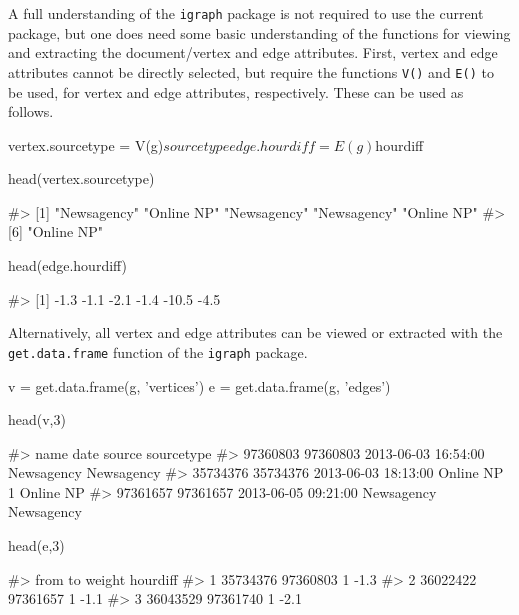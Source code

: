 A full understanding of the \texttt{igraph} package is not required to
use the current package, but one does need some basic understanding of
the functions for viewing and extracting the document/vertex and edge
attributes. First, vertex and edge attributes cannot be directly
selected, but require the functions \texttt{V()} and \texttt{E()} to be
used, for vertex and edge attributes, respectively. These can be used as
follows.

\begin{Schunk}
\begin{Sinput}
vertex.sourcetype = V(g)$sourcetype
edge.hourdiff = E(g)$hourdiff

head(vertex.sourcetype)
\end{Sinput}
\begin{Soutput}
#> [1] "Newsagency" "Online NP"  "Newsagency" "Newsagency" "Online NP" 
#> [6] "Online NP"
\end{Soutput}
\begin{Sinput}
head(edge.hourdiff)
\end{Sinput}
\begin{Soutput}
#> [1]  -1.3  -1.1  -2.1  -1.4 -10.5  -4.5
\end{Soutput}
\end{Schunk}

Alternatively, all vertex and edge attributes can be viewed or extracted
with the \texttt{get.data.frame} function of the \texttt{igraph}
package.

\begin{Schunk}
\begin{Sinput}
v = get.data.frame(g, 'vertices')
e = get.data.frame(g, 'edges')

head(v,3)
\end{Sinput}
\begin{Soutput}
#>              name                date      source sourcetype
#> 97360803 97360803 2013-06-03 16:54:00  Newsagency Newsagency
#> 35734376 35734376 2013-06-03 18:13:00 Online NP 1  Online NP
#> 97361657 97361657 2013-06-05 09:21:00  Newsagency Newsagency
\end{Soutput}
\begin{Sinput}
head(e,3)                   
\end{Sinput}
\begin{Soutput}
#>       from       to weight hourdiff
#> 1 35734376 97360803      1     -1.3
#> 2 36022422 97361657      1     -1.1
#> 3 36043529 97361740      1     -2.1
\end{Soutput}
\end{Schunk}

